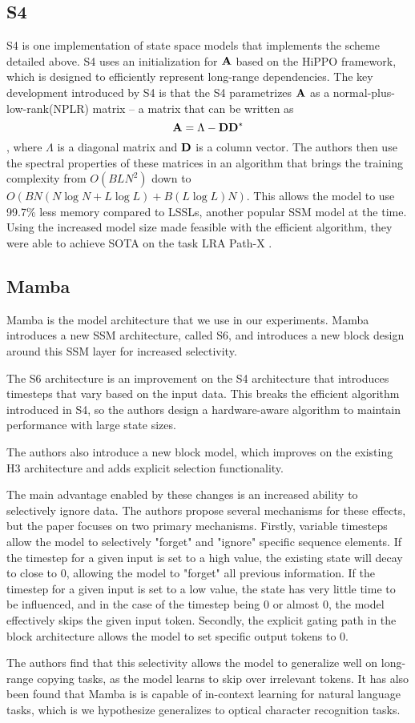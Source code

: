 \subsection{S4}
S4\cite{s4} is one implementation of state space models that implements the
scheme detailed above.
S4 uses an initialization for ${\mathbf{A}}$ based on the HiPPO framework, which is
designed to efficiently represent long-range dependencies.
The key development introduced by S4 is that the S4 parametrizes ${\mathbf{A}}$ as a
normal-plus-low-rank(NPLR) matrix -- a matrix that can be written as
$$
{\mathbf{A}} = \Lambda - {\mathbf{D}}{\mathbf{D}}^*
$$
, where $\Lambda$ is a diagonal matrix and ${\mathbf{D}}$ is a column vector. The authors
then use the spectral properties of these matrices in an algorithm that brings
the training complexity from $O(BLN^2)$ down to
$O(BN(N \log N + L \log L) + B(L \log L)N)$\cite{s4}. This allows the model to
use 99.7\% less memory compared to LSSLs, another popular SSM model at the time.
Using the increased model size made feasible with the efficient algorithm, they
were able to achieve SOTA on the task LRA Path-X \cite{lra}.

\subsection{Mamba}
Mamba\cite{mamba} is the model architecture that we use in our experiments.
Mamba introduces a new SSM architecture, called S6, and introduces a new block
design around this SSM layer for increased selectivity.

The S6 architecture is an improvement on the S4 architecture that introduces
timesteps that vary based on the input data.
This breaks the efficient algorithm introduced in S4, so the authors design a
hardware-aware algorithm to maintain performance with large state sizes.

The authors also introduce a new block model, which improves on the
existing H3\cite{h3} architecture and adds explicit selection functionality.

The main advantage enabled by these changes is an increased ability to
selectively ignore data.
The authors propose several mechanisms for these effects, but the paper focuses
on two primary mechanisms.
Firstly, variable timesteps allow the model to selectively "forget" and "ignore"
specific sequence elements.
If the timestep for a given input is set to a high value, the existing state
will decay to close to 0, allowing the model to "forget" all previous
information. If the timestep for a given input is set to a low value, the state
has very little time to be influenced, and in the case of the timestep being 0
or almost 0, the model effectively skips the given input token.
Secondly, the explicit gating path in the block architecture allows the model to
set specific output tokens to 0.

The authors find that this selectivity allows the model to generalize well on
long-range copying tasks, as the model learns to skip over irrelevant tokens.
It has also been found that Mamba is is capable of in-context learning for
natural language tasks\cite{mambaicl}, which is we hypothesize generalizes to
optical character recognition tasks.

